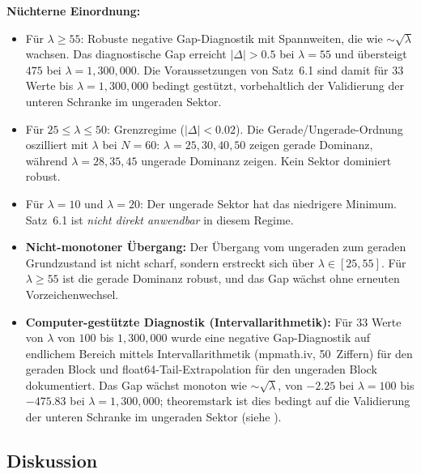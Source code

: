 ﻿\documentclass[12pt,a4paper]{article}
\theoremstyle{definition}
\theoremstyle{remark}
\begin{document}
\medskip\noindent
\textbf{Nüchterne Einordnung:}
\begin{itemize}
  \item Für $\lambda \geq 55$: Robuste negative Gap-Diagnostik mit Spannweiten, die wie $\sim\!\sqrt{\lambda}$ wachsen. Das diagnostische Gap erreicht $|\Delta| > 0.5$ bei $\lambda = 55$ und übersteigt $475$ bei $\lambda = 1{,}300{,}000$. Die Voraussetzungen von Satz~6.1 sind damit für $33$ Werte bis $\lambda = 1{,}300{,}000$ bedingt gestützt, vorbehaltlich der Validierung der unteren Schranke im ungeraden Sektor.
  \item Für $25 \leq \lambda \leq 50$: Grenzregime ($|\Delta| < 0.02$). Die Gerade/Ungerade-Ordnung oszilliert mit $\lambda$ bei $N = 60$: $\lambda = 25, 30, 40, 50$ zeigen gerade Dominanz, während $\lambda = 28, 35, 45$ ungerade Dominanz zeigen. Kein Sektor dominiert robust.
  \item Für $\lambda = 10$ und $\lambda = 20$: Der ungerade Sektor hat das niedrigere Minimum. Satz~6.1 ist \emph{nicht direkt anwendbar} in diesem Regime.
  \item \textbf{Nicht-monotoner Übergang:} Der Übergang vom ungeraden zum geraden Grundzustand ist nicht scharf, sondern erstreckt sich über $\lambda \in [25, 55]$. Für $\lambda \geq 55$ ist die gerade Dominanz robust, und das Gap wächst ohne erneuten Vorzeichenwechsel.
  \item \textbf{Computer-gestützte Diagnostik (Intervallarithmetik):} Für $33$ Werte von $\lambda$ von $100$ bis $1{,}300{,}000$ wurde eine negative Gap-Diagnostik auf endlichem Bereich mittels Intervallarithmetik (mpmath.iv, 50~Ziffern) für den geraden Block und float64-Tail-Extrapolation für den ungeraden Block dokumentiert. Das Gap wächst monoton wie $\sim\!\sqrt{\lambda}$, von $-2.25$ bei $\lambda = 100$ bis $-475.83$ bei $\lambda = 1{,}300{,}000$; theoremstark ist dies bedingt auf die Validierung der unteren Schranke im ungeraden Sektor (siehe ).
\end{itemize}

\subsection{Diskussion}
\end{document}
